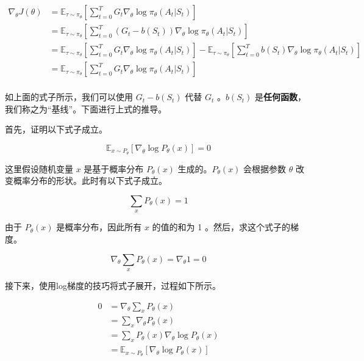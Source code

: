 \documentclass[lang=cn,newtx,10pt,scheme=chinese]{elegantbook}
\begin{document}
\begin{equation}
\begin{aligned}
\nabla_\theta J(\theta) &= \mathbb{E}_{\tau\sim\pi_\theta}\left\lbrack{\sum_{t=0}^TG_t\nabla_\theta\log\pi_\theta(A_t|S_t)}\right\rbrack \\
&= \mathbb{E}_{\tau\sim\pi_\theta}\left\lbrack{\sum_{t=0}^T(G_t-b(S_t))\nabla_\theta\log\pi_\theta(A_t|S_t)}\right\rbrack \\
&= \mathbb{E}_{\tau\sim \pi_{\theta}}\left[ \sum_{t=0}^TG_{t}\nabla_{\theta}\log \pi_{\theta}(A_{t}|S_{t})\right] -\mathbb{E}_{\tau\sim \pi_{\theta}}\left[ \sum_{t=0}^Tb(S_{t})\nabla_{\theta}\log \pi_{\theta}(A_{t}|S_{t}) \right] \\
&= \mathbb{E}_{\tau\sim\pi_\theta}\left\lbrack{\sum_{t=0}^TG_t\nabla_\theta\log\pi_\theta(A_t|S_t)}\right\rbrack \\
\end{aligned}
\end{equation}

如上面的式子所示，我们可以使用 $G_t-b(S_t)$ 代替 $G_t$ 。$b(S_t)$ 是\textbf{任何函数}，我们称之为``基线''。下面进行上式的推导。

首先，证明以下式子成立。

\begin{equation}
\mathbb{E}_{x\sim P_\theta}\left\lbrack{\nabla_\theta\log P_\theta(x)}\right\rbrack = 0
\end{equation}

这里假设随机变量 $x$ 是基于概率分布 $P_\theta(x)$ 生成的。$P_\theta(x)$ 会根据参数 $\theta$ 改变概率分布的形状。此时有以下式子成立。

\begin{equation}
\sum_xP_\theta(x)=1
\end{equation}

由于 $P_\theta(x)$ 是概率分布，因此所有 $x$ 的值的和为 1 。然后，求这个式子的梯度。

\begin{equation}
\nabla_\theta\sum_xP_\theta(x)=\nabla_\theta 1 = 0
\end{equation}

接下来，使用log梯度的技巧将式子展开，过程如下所示。

\begin{equation}
\begin{aligned}
0 &= \nabla_\theta\sum_xP_\theta(x) \\
&= \sum_x\nabla_\theta P_\theta(x) \\
&= \sum_xP_\theta(x)\nabla_\theta\log P_\theta(x) \\
&= \mathbb{E}_{x\sim P_\theta}\left\lbrack{\nabla_\theta\log P_\theta(x)}\right\rbrack
\end{aligned}
\end{equation}
\end{document}
